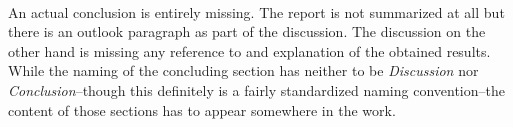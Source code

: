 \documentclass[../review.tex]{subfiles}
\begin{document}
\\
An actual conclusion is entirely missing. The report is not summarized at all but there is an outlook paragraph as part of the discussion. The discussion on the other hand is missing any reference to and explanation of the obtained results. While the naming of the concluding section has neither to be \textit{Discussion} nor \textit{Conclusion}--though this definitely is a fairly standardized naming convention--the content of those sections has to appear somewhere in the work.
\end{document}
